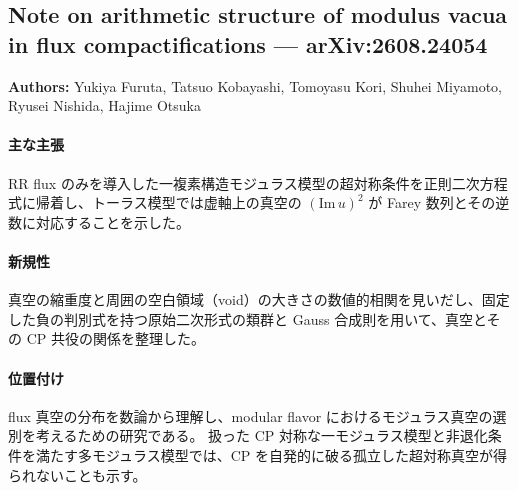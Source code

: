 \subsection{Note on arithmetic structure of modulus vacua in flux compactifications --- arXiv:2608.24054}

\textbf{Authors:} Yukiya Furuta, Tatsuo Kobayashi, Tomoyasu Kori, Shuhei Miyamoto, Ryusei Nishida, Hajime Otsuka

\paragraph{主な主張}
RR flux のみを導入した一複素構造モジュラス模型の超対称条件を正則二次方程式に帰着し、トーラス模型では虚軸上の真空の $(\mathrm{Im}\,u)^2$ が Farey 数列とその逆数に対応することを示した\cite{Furuta:2026arithmetic}。

\paragraph{新規性}
真空の縮重度と周囲の空白領域（void）の大きさの数値的相関を見いだし、固定した負の判別式を持つ原始二次形式の類群と Gauss 合成則を用いて、真空とその CP 共役の関係を整理した。

\paragraph{位置付け}
flux 真空の分布を数論から理解し、modular flavor におけるモジュラス真空の選別を考えるための研究である。
扱った CP 対称な一モジュラス模型と非退化条件を満たす多モジュラス模型では、CP を自発的に破る孤立した超対称真空が得られないことも示す。
